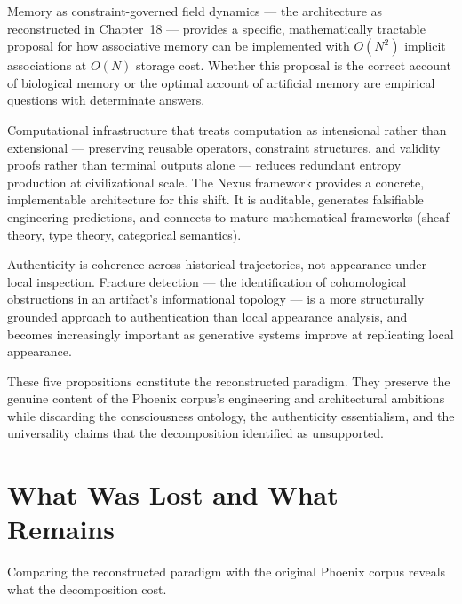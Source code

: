 \begin{proposition}
\label{prop:field-memory}
Memory as constraint-governed field dynamics --- the
\MEMeight{} architecture as reconstructed in Chapter~18
--- provides a specific, mathematically tractable
proposal for how associative memory can be implemented
with $O(N^2)$ implicit associations at $O(N)$ storage
cost. Whether this proposal is the correct account
of biological memory or the optimal account of
artificial memory are empirical questions with
determinate answers.
\end{proposition}

\begin{proposition}
\label{prop:intensional-memory}
Computational infrastructure that treats computation
as intensional rather than extensional --- preserving
reusable operators, constraint structures, and validity
proofs rather than terminal outputs alone --- reduces
redundant entropy production at civilizational scale.
The Nexus framework provides a concrete, implementable
architecture for this shift. It is auditable, generates
falsifiable engineering predictions, and connects to
mature mathematical frameworks (sheaf theory, type
theory, categorical semantics).
\end{proposition}

\begin{proposition}
\label{prop:fracture-authenticity}
Authenticity is coherence across historical trajectories,
not appearance under local inspection. Fracture
detection --- the identification of cohomological
obstructions in an artifact's informational topology
--- is a more structurally grounded approach to
authentication than local appearance analysis, and
becomes increasingly important as generative systems
improve at replicating local appearance.
\end{proposition}

These five propositions constitute the reconstructed
paradigm. They preserve the genuine content of the
Phoenix corpus's engineering and architectural ambitions
while discarding the consciousness ontology, the
authenticity essentialism, and the universality claims
that the decomposition identified as unsupported.

\section{What Was Lost and What Remains}
\label{sec:lost-and-remains}

Comparing the reconstructed paradigm with the original
Phoenix corpus reveals what the decomposition cost.

